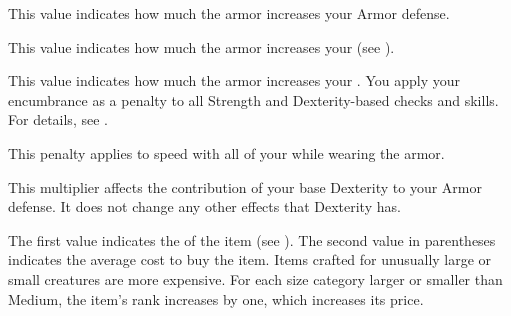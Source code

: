          This value indicates how much the armor increases your Armor defense.

         This value indicates how much the armor increases your  (see ).

         This value indicates how much the armor increases your .
        You apply your encumbrance as a penalty to all Strength and Dexterity-based checks and skills.
        For details, see .

         This penalty applies to speed with all of your  while wearing the armor.

         This multiplier affects the contribution of your base Dexterity to your Armor defense.
        It does not change any other effects that Dexterity has.

         The first value indicates the  of the item (see ).
        The second value in parentheses indicates the average cost to buy the item.
        Items crafted for unusually large or small creatures are more expensive.
        For each size category larger or smaller than Medium, the item's rank increases by one, which increases its price.


